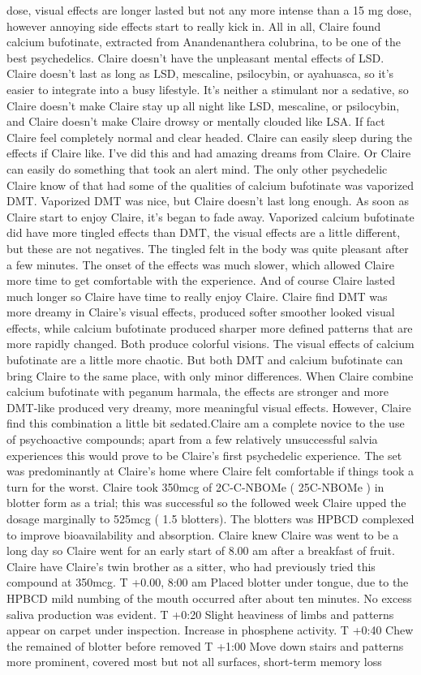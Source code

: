 \documentclass[12pt]{book}
\begin{document}
dose, visual effects are longer lasted but not any more intense than a 15 mg dose, however annoying side effects start to really kick in. All in all, Claire found calcium bufotinate, extracted from Anandenanthera colubrina, to be one of the best psychedelics. Claire doesn't have the unpleasant mental effects of LSD. Claire doesn't last as long as LSD, mescaline, psilocybin, or ayahuasca, so it's easier to integrate into a busy lifestyle. It's neither a stimulant nor a sedative, so Claire doesn't make Claire stay up all night like LSD, mescaline, or psilocybin, and Claire doesn't make Claire drowsy or mentally clouded like LSA. If fact Claire feel completely normal and clear headed. Claire can easily sleep during the effects if Claire like. I've did this and had amazing dreams from Claire. Or Claire can easily do something that took an alert mind. The only other psychedelic Claire know of that had some of the qualities of calcium bufotinate was vaporized DMT. Vaporized DMT was nice, but Claire doesn't last long enough. As soon as Claire start to enjoy Claire, it's began to fade away. Vaporized calcium bufotinate did have more tingled effects than DMT, the visual effects are a little different, but these are not negatives. The tingled felt in the body was quite pleasant after a few minutes. The onset of the effects was much slower, which allowed Claire more time to get comfortable with the experience. And of course Claire lasted much longer so Claire have time to really enjoy Claire. Claire find DMT was more dreamy in Claire's visual effects, produced softer smoother looked visual effects, while calcium bufotinate produced sharper more defined patterns that are more rapidly changed. Both produce colorful visions. The visual effects of calcium bufotinate are a little more chaotic. But both DMT and calcium bufotinate can bring Claire to the same place, with only minor differences. When Claire combine calcium bufotinate with peganum harmala, the effects are stronger and more DMT-like produced very dreamy, more meaningful visual effects. However, Claire find this combination a little bit sedated.Claire am a complete novice to the use of psychoactive compounds; apart from a few relatively unsuccessful salvia experiences this would prove to be Claire's first psychedelic experience. The set was predominantly at Claire's home where Claire felt comfortable if things took a turn for the worst. Claire took 350mcg of 2C-C-NBOMe ( 25C-NBOMe ) in blotter form as a trial; this was successful so the followed week Claire upped the dosage marginally to 525mcg ( 1.5 blotters). The blotters was HPBCD complexed to improve bioavailability and absorption. Claire knew Claire was went to be a long day so Claire went for an early start of 8.00 am after a breakfast of fruit. Claire have Claire's twin brother as a sitter, who had previously tried this compound at 350mcg. T +0.00, 8:00 am Placed blotter under tongue, due to the HPBCD mild numbing of the mouth occurred after about ten minutes. No excess saliva production was evident. T +0:20 Slight heaviness of limbs and patterns appear on carpet under inspection. Increase in phosphene activity. T +0:40 Chew the remained of blotter before removed T +1:00 Move down stairs and patterns more prominent, covered most but not all surfaces, short-term memory loss 
\end{document}
